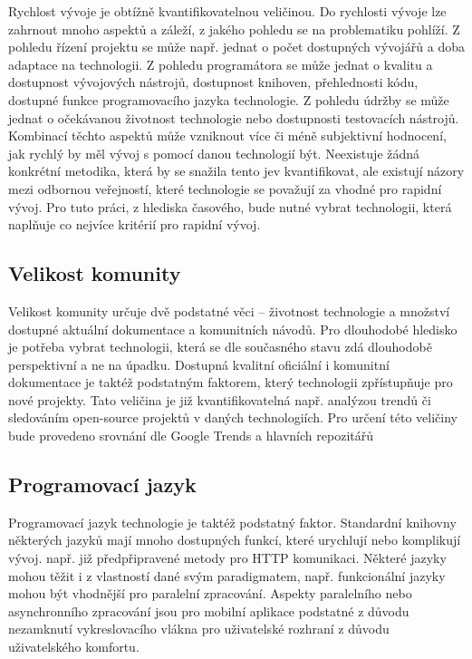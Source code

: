 Rychlost vývoje je obtížně kvantifikovatelnou veličinou. Do rychlosti vývoje lze zahrnout mnoho aspektů a záleží, z jakého pohledu se na problematiku pohlíží. Z pohledu řízení projektu se může např. jednat o počet dostupných vývojářů a doba adaptace na technologii. Z pohledu programátora se může jednat o kvalitu a dostupnost vývojových nástrojů, dostupnost knihoven, přehlednosti kódu, dostupné funkce programovacího jazyka technologie. Z pohledu údržby se může jednat o očekávanou životnost technologie nebo dostupnosti testovacích nástrojů. Kombinací těchto aspektů může vzniknout více či méně subjektivní hodnocení, jak rychlý by měl vývoj s pomocí danou technologií být. Neexistuje žádná konkrétní metodika, která by se snažila tento jev kvantifikovat, ale existují názory mezi odbornou veřejností, které technologie se považují za vhodné pro rapidní vývoj. Pro tuto práci, z hlediska časového, bude nutné vybrat technologii, která naplňuje co nejvíce kritérií pro rapidní vývoj.

\subsection{Velikost komunity}

Velikost komunity určuje dvě podstatné věci -- životnost technologie a množství dostupné aktuální dokumentace a komunitních návodů. Pro dlouhodobé hledisko je potřeba vybrat technologii, která se dle současného stavu zdá dlouhodobě perspektivní a ne na úpadku. Dostupná kvalitní oficiální i komunitní dokumentace je taktéž podstatným faktorem, který technologii zpřístupňuje pro nové projekty. Tato veličina je již kvantifikovatelná např. analýzou trendů či sledováním open-source projektů v daných technologiích. Pro určení této veličiny bude provedeno srovnání dle Google Trends a hlavních repozitářů

\subsection{Programovací jazyk}

Programovací jazyk technologie je taktéž podstatný faktor. Standardní knihovny některých jazyků mají mnoho dostupných funkcí, které urychlují nebo komplikují vývoj. např. již předpřipravené metody pro HTTP komunikaci. Některé jazyky mohou těžit i z vlastností dané svým paradigmatem, např. funkcionální jazyky mohou být vhodnější pro paralelní zpracování. Aspekty paralelního nebo asynchronního zpracování jsou pro mobilní aplikace podstatné z důvodu nezamknutí vykreslovacího vlákna pro uživatelské rozhraní z důvodu uživatelského komfortu.


